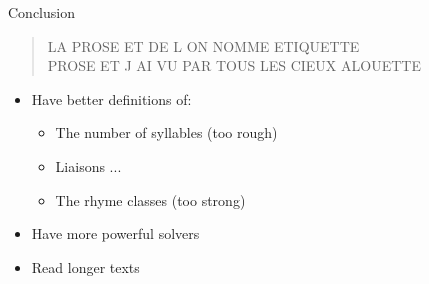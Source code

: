 \documentclass[unknownkeysallowed]{beamer}
\begin{document}
\begin{frame}[fragile]{Conclusion}
\begin{quote}
\small
\og LA PROSE ET DE L ON NOMME ETIQUETTE \\
 PROSE ET J AI VU PAR TOUS LES CIEUX ALOUETTE \fg
\end{quote}

\begin{itemize}
\item Have better definitions of:
\begin{itemize}
\item The number of syllables (too rough)
\item Liaisons ...
\item The rhyme classes (too strong)
\end{itemize}
\item Have more powerful solvers
\item Read longer texts
\end{itemize}
\end{frame}
\end{document}
